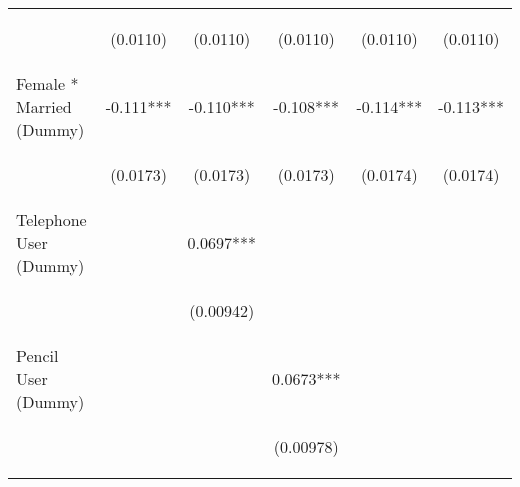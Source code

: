 \begin{center}
\begin{tabular}{lccccc}
\vspace{4pt} & \begin{footnotesize}(0.0110)\end{footnotesize} & \begin{footnotesize}(0.0110)\end{footnotesize} & \begin{footnotesize}(0.0110)\end{footnotesize} & \begin{footnotesize}(0.0110)\end{footnotesize} & \begin{footnotesize}(0.0110)\end{footnotesize} \\
Female * Married (Dummy) & -0.111*** & -0.110*** & -0.108*** & -0.114*** & -0.113*** \\
\vspace{4pt} & \begin{footnotesize}(0.0173)\end{footnotesize} & \begin{footnotesize}(0.0173)\end{footnotesize} & \begin{footnotesize}(0.0173)\end{footnotesize} & \begin{footnotesize}(0.0174)\end{footnotesize} & \begin{footnotesize}(0.0174)\end{footnotesize} \\
Telephone User (Dummy) &  & 0.0697*** &  &  &  \\
\vspace{4pt} & \begin{footnotesize}\end{footnotesize} & \begin{footnotesize}(0.00942)\end{footnotesize} & \begin{footnotesize}\end{footnotesize} & \begin{footnotesize}\end{footnotesize} & \begin{footnotesize}\end{footnotesize} \\
Pencil User (Dummy) &  &  & 0.0673*** &  &  \\
\vspace{4pt} & \begin{footnotesize}\end{footnotesize} & \begin{footnotesize}\end{footnotesize} & \begin{footnotesize}(0.00978)\end{footnotesize} & \begin{footnotesize}\end{footnotesize} & \begin{footnotesize}\end{footnotesize} \\

\end{tabular}
\end{center}
